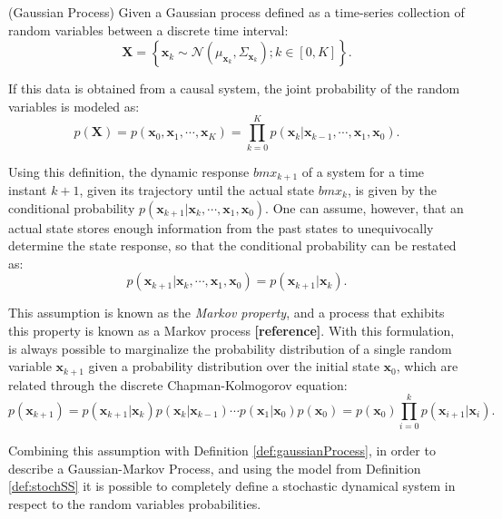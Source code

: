 \documentclass[a4paper,11pt]{book}
\numberwithin{figure}{chapter}
\numberwithin{equation}{chapter}
\numberwithin{table}{chapter}
\theoremstyle{definition}
\newtheorem{definition}{Definition}[chapter]
\newcounter{boxed-theorem}
\newcounter{boxed-definition}
\newenvironment{boxed-definition}[1]
{\begin{shaded} \begin{definition}{#1}}
{\end{definition} \end{shaded}}
\begin{document}
\begin{boxed-definition}{(Gaussian Process)} \label{def:gaussianProcess}
    Given a Gaussian process defined as a time-series collection of random variables between a discrete time interval:
    \begin{equation}
        \bm{X} = \left\{ \bm{x}_k \sim \mathcal{N}(\mu_{\bm{x}_k}, \Sigma_{\bm{x}_k}) ; k \in [0, K] \right\}
    .\end{equation}
    
    If this data is obtained from a causal system, the joint probability of the random variables is modeled as:
    \begin{equation}
        p(\bm{X}) = p(\bm{x}_0, \bm{x}_1, \cdots, \bm{x}_K) = \prod_{k=0}^K p(\bm{x}_k | \bm{x}_{k-1}, \cdots, \bm{x}_1, \bm{x}_0)
    .\end{equation}
\end{boxed-definition}

Using this definition, the dynamic response $bm{x}_{k+1}$ of a system for a time instant $k+1$, given its trajectory until the actual state $bm{x}_{k}$, is given by the conditional probability $p(\bm{x}_{k+1} | \bm{x}_{k}, \cdots, \bm{x}_1, \bm{x}_0)$. One can assume, however, that an actual state stores enough information from the past states to unequivocally determine the state response, so that the conditional probability can be restated as:
\begin{equation}
    p(\bm{x}_{k+1} | \bm{x}_{k}, \cdots, \bm{x}_1, \bm{x}_0) =  p(\bm{x}_{k+1} | \bm{x}_{k})
.\end{equation}

This assumption is known as the \textit{Markov property}, and a process that exhibits this property is known as a Markov process \textbf{[reference]}. With this formulation, is always possible to marginalize the probability distribution of a single random variable $\bm{x}_{k+1}$ given a probability distribution over the initial state $\bm{x}_0$, which are related through the discrete Chapman-Kolmogorov equation:
\begin{equation}
    p(\bm{x}_{k+1}) =  p(\bm{x}_{k+1} | \bm{x}_{k}) p(\bm{x}_{k} | \bm{x}_{k-1}) \cdots p(\bm{x}_{1} | \bm{x}_{0})p(\bm{x}_0) = p(\bm{x}_0) \prod_{i=0}^k p(\bm{x}_{i+1} | \bm{x}_{i})
.\end{equation}


Combining this assumption with Definition \ref{def:gaussianProcess}, in order to describe a Gaussian-Markov Process, and using the model from Definition \ref{def:stochSS} it is possible to completely define a stochastic dynamical system in respect to the random variables probabilities.
\end{document}
